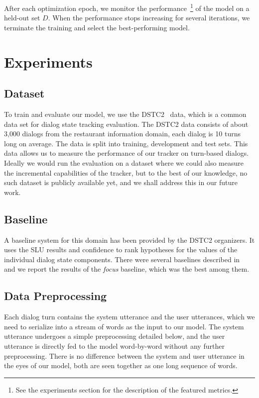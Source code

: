 \documentclass[11pt,twocolumn]{article}
\begin{document}
After each optimization epoch, we monitor the performance~\footnote{See the experiments section for the description of the featured metrics.} of the model on a held-out set $D$. When the performance stops increasing for several iterations, we terminate the training and select the best-performing model.


\section{Experiments}
\label{sec:experiments}
\subsection{Dataset}
To train and evaluate our model, we use the DSTC2~\cite{henderson2014second} data, which is a common data set for dialog state tracking evaluation. The DSTC2 data consists of about 3,000 dialogs from the restaurant information domain, each dialog is 10 turns long on average. The data is split into training, development and test sets. This data allows us to measure the performance of our tracker on turn-based dialogs. Ideally we would run the evaluation on a dataset where we could also measure the incremental capabilities of the tracker, but to the best of our knowledge, no such dataset is publicly available yet, and we shall address this in our future work.

\subsection{Baseline}
A baseline system for this domain has been provided by the DSTC2 organizers. It uses the SLU results and confidence to rank hypotheses for the values of the individual dialog state components. There were several baselines described in~\cite{henderson2014second} and we report the results of the \emph{focus} baseline, which was the best among them.

\subsection{Data Preprocessing}
Each dialog turn contains the system utterance and the user utterances, which we need to serialize into a stream of words as the input to our model. The system utterance undergoes a simple preprocessing detailed below, and the user utterance is directly fed to the model word-by-word without any further preprocessing. There is no difference between the system and user utterance in the eyes of our model, both are seen together as one long sequence of words.
\end{document}
